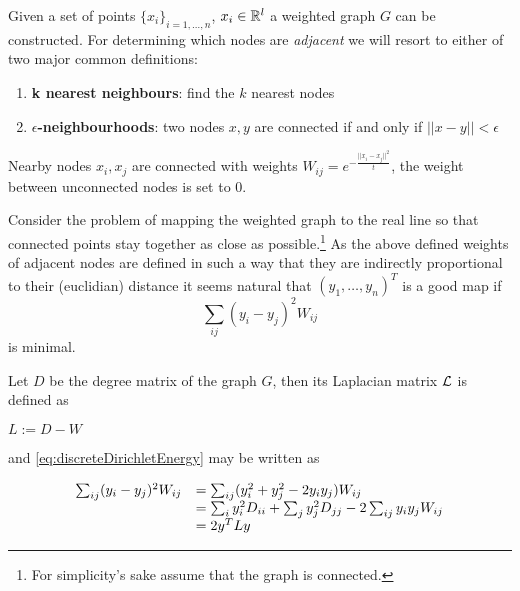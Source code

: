 Given a set of points $\{x_i\}_{i=1,\dots,n}$, $x_i \in \mathbb{R}^l$ a weighted graph $G$ can be constructed. For determining which nodes are \textit{adjacent} we will resort to either of two major common definitions:
\begin{enumerate}
    \item \textbf{k nearest neighbours}: find the $k$ nearest nodes
    \item \textbf{$\epsilon$-neighbourhoods}: two nodes $x,y$ are connected if and only if $||x-y||<\epsilon$
\end{enumerate}

Nearby nodes $x_i,x_j$ are connected with weights $W_{ij}=e^{-\frac{||x_i - x_j||^2}{t}}$, the weight between unconnected nodes is set to $0$.

Consider the problem of mapping the weighted graph to the real line so that connected points stay together as close as possible.\footnote{For simplicity's sake assume that the graph is connected.}
As the above defined weights of adjacent nodes are defined in such a way that they are indirectly proportional to their (euclidian) distance it seems natural that $(y_1,\dots,y_n)^T$ is a good map if
\begin{equation} \label{eq:discreteDirichletEnergy}
    \sum_{ij} (y_i - y_j)^2 W_{ij}
\end{equation}
is minimal.

Let $D$ be the degree matrix of the graph $G$, then its Laplacian matrix $\mathcal{L}$ is defined as
\begin{definition}
    $L:=D-W$
\end{definition}

and \eqref{eq:discreteDirichletEnergy} may be written as 

\begin{equation*}\begin{array}{l l}
\sum_{ij} (y_i - y_j)^2 W_{ij} &= \sum_{ij} (y_i^2 + y_j^2 - 2y_i y_j) W_{ij}\\
    &= \sum_{i} y_i^2 D_{ii} + \sum_{j} y_j^2 D_{jj} - 2\sum_{ij} y_i y_j W_{ij}\\
    &= 2y^TLy
\end{array}\end{equation*}


